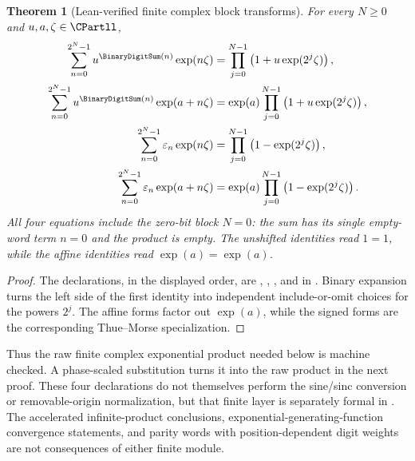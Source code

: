 \documentclass[11pt]{article}
\numberwithin{equation}{section}
\newtheorem{theorem}{Theorem}[section]
\theoremstyle{definition}
\theoremstyle{remark}
\begin{document}
\begin{theorem}[Lean-verified finite complex block transforms]
\label{p8:thm:lean-complex-block-transforms}
For every $N\ge0$ and $u,a,\zeta\in\CPartll$,
\begin{align}
 \sum_{n=0}^{2^N-1}u^{\BinaryDigitSum(n)}\exp(n\zeta)
 &=\prod_{j=0}^{N-1}\left(1+u\exp(2^j\zeta)\right),
 \label{p8:eq:lean-weighted-complex-block}\\
 \sum_{n=0}^{2^N-1}u^{\BinaryDigitSum(n)}\exp(a+n\zeta)
 &=\exp(a)\prod_{j=0}^{N-1}\left(1+u\exp(2^j\zeta)\right),
 \label{p8:eq:lean-weighted-complex-block-affine}\\
 \sum_{n=0}^{2^N-1}\varepsilon_n\exp(n\zeta)
 &=\prod_{j=0}^{N-1}\left(1-\exp(2^j\zeta)\right),
 \label{p8:eq:lean-signed-complex-block}\\
 \sum_{n=0}^{2^N-1}\varepsilon_n\exp(a+n\zeta)
 &=\exp(a)\prod_{j=0}^{N-1}\left(1-\exp(2^j\zeta)\right).
 \label{p8:eq:lean-signed-complex-block-affine}
\end{align}
All four equations include the zero-bit block $N=0$: the sum has its single empty-word term
$n=0$ and the product is empty.  The unshifted identities read $1=1$, while the affine
identities read $\exp(a)=\exp(a)$.
\end{theorem}

\begin{proof}
The declarations, in the displayed order, are
,
,
, and
 in
.  Binary expansion turns the left side of the first
identity into independent include-or-omit choices for the powers $2^j$.  The affine forms
factor out $\exp(a)$, while the signed forms are the corresponding Thue--Morse
specialization.
\end{proof}

Thus the raw finite complex exponential product needed below is machine checked.  A
phase-scaled substitution turns it into the raw product in the next proof.  These four
declarations do not themselves perform the sine/sinc conversion or removable-origin
normalization, but that finite layer is separately formal in
.  The accelerated infinite-product conclusions,
exponential-generating-function convergence statements, and parity words with
position-dependent digit weights are not consequences of either finite module.
\end{document}
